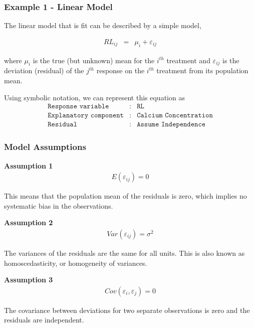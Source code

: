 \begin{frame}\frametitle{Example 1  - Linear Model}
The linear model that is fit can be described by a simple model,

\begin{eqnarray*}
  RL_{ij} &=& \mu_i + \varepsilon_{ij}
\end{eqnarray*}

where $\mu_i$ is the true (but unknown) mean for the $i^{th}$ treatment and $\varepsilon_{ij}$ is the deviation
(residual) of the $j^{th}$ response on the $i^{th}$ treatment from its population mean.

Using symbolic notation, we can represent this equation as
\begin{eqnarray*}
	\texttt{Response variable}&:& \texttt{RL} \\
	\texttt{Explanatory component}&:& \texttt{Calcium Concentration}\\
	\texttt{Residual}&:& \texttt{Assume Independence}
\end{eqnarray*}

\end{frame}


\begin{frame}\frametitle{Model Assumptions}
\textbf{Assumption 1}
\begin{eqnarray*}
E(\varepsilon_{ij}) = 0
\end{eqnarray*}

This means that the population mean of the residuals is zero, which implies no systematic bias in the observations.

\textbf{Assumption 2}
\begin{eqnarray*}
Var(\varepsilon_{ij}) = \sigma^2
\end{eqnarray*}

The variances of the residuals are the same for all units. This is also known as homoscedasticity, or homogeneity of
variances.

\textbf{Assumption 3}
\begin{eqnarray*}
Cov(\varepsilon_{i},\varepsilon_{j}) = 0
\end{eqnarray*}

The covariance between deviations for two separate observations is zero and the residuals are independent.

\end{frame}


